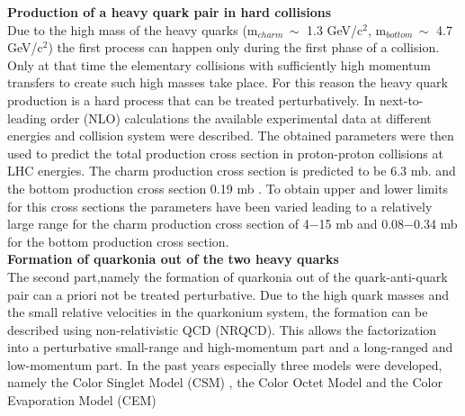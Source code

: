 {\bf Production of a heavy quark pair in hard collisions}\\
Due to the high mass of the heavy quarks (m$_{charm}\,\sim$ 1.3 GeV/c$^2$, m$_{bottom}\,\sim$ 4.7 GeV/c$^2$) 
the first process can happen only during the first phase of a collision. Only at that
time the elementary collisions with sufficiently high momentum transfers to
create such high masses take place. For this reason the heavy quark production
is a hard process that can be treated perturbatively. In next-to-leading order
(NLO) calculations the available experimental data at different energies and
collision system \cite{Baines,Ramona_Paper1} were described. The obtained parameters were then
used to predict the total production cross section in proton-proton collisions at
LHC energies. The charm production cross section is predicted to be 6.3 mb.
and the bottom production cross section 0.19 mb \cite{Ramona_Paper2}. To obtain upper and
lower limits for this cross sections the parameters have been varied leading to
a relatively large range for the charm production cross section of 4$-$15 mb and
0.08$-$0.34 mb for the bottom production cross section. \\
{\bf Formation of quarkonia out of the two heavy quarks}\\
The second part,namely the formation of quarkonia out of the quark-anti-quark pair can a
priori not be treated perturbative. Due to the high quark masses and the
small relative velocities in the quarkonium system, the formation can be described
using non-relativistic QCD (NRQCD). This allows the factorization
into a perturbative small-range and high-momentum part and a long-ranged
and low-momentum part. In the past years especially three models were developed,
namely the Color Singlet Model (CSM) \cite{CSM1, CSM2}, the Color Octet
Model \cite{COM1, COM2, COM3} and the Color Evaporation Model (CEM) \cite{CEM1, CEM2, CEM3}
